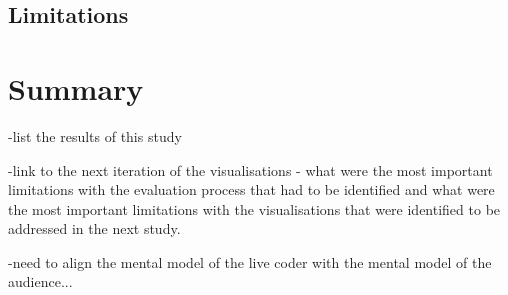 \subsection{Limitations}

\more

\section{Summary}

-list the results of this study

-link to the next iteration of the visualisations - what were the most important limitations with the evaluation process that had to be identified and what were the most important limitations with the visualisations that were identified to be addressed in the next study.

-need to align the mental model of the live coder with the mental model of the audience...

\more





